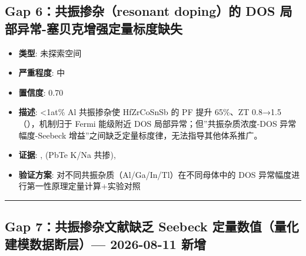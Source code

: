 \documentclass[12pt,a4paper]{ctexart}
\providecommand{\tightlist}{%
  \setlength{\itemsep}{0pt}\setlength{\parskip}{0pt}}
\begin{document}
\subsection{Gap 6：共振掺杂（resonant doping）的 DOS 局部异常-塞贝克增强定量标度缺失}\label{gap:gap-6ux5171ux632fux63baux6742resonant-dopingux7684-dos-ux5c40ux90e8ux5f02ux5e38-ux585eux8d1dux514bux589eux5f3aux5b9aux91cfux6807ux5ea6ux7f3aux5931}

\begin{itemize}
\tightlist
\item
  \textbf{类型}: 未探索空间
\item
  \textbf{严重程度}: 中
\item
  \textbf{置信度}: 0.70
\item
  \textbf{描述}: \textless1at\% Al 共振掺杂使 HfZrCoSnSb 的 PF 提升 65\%、ZT 0.8→1.5（\cite{TE146}），机制归于 Fermi 能级附近 DOS 局部异常；但''共振杂质浓度-DOS 异常幅度-Seebeck 增益''之间缺乏定量标度律，无法指导其他体系推广。
\item
  \textbf{证据}: \cite{TE146}, \cite{TE087} (PbTe K/Na 共掺), \cite{TE101}
\item
  \textbf{验证方案}: 对不同共振杂质（Al/Ga/In/Tl）在不同母体中的 DOS 异常幅度进行第一性原理定量计算+实验对照
\end{itemize}

\begin{center}\rule{0.5\linewidth}{0.5pt}\end{center}

\subsection{Gap 7：共振掺杂文献缺乏 Seebeck 定量数值（量化建模数据断层）--- 2026-08-11 新增}\label{gap:gap-7ux5171ux632fux63baux6742ux6587ux732eux7f3aux4e4f-seebeck-ux5b9aux91cfux6570ux503cux91cfux5316ux5efaux6a21ux6570ux636eux65adux5c42-2026-08-11-ux65b0ux589e}
\end{document}
